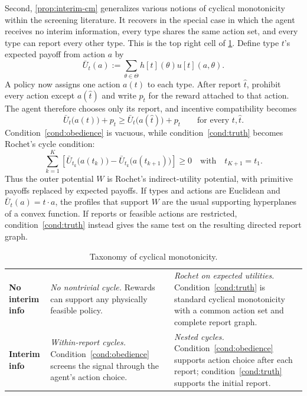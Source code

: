\documentclass[12pt,reqno]{article}
\theoremstyle{definition} \newtheorem{example}{Example}
\theoremstyle{definition} \newtheorem{condition}{Condition}
\theoremstyle{definition} \newtheorem{corollary}{Corollary}
\theoremstyle{definition} \newtheorem{claim}{Claim}
\theoremstyle{definition} \newtheorem{definition}{Definition}
\theoremstyle{definition} \newtheorem{conjecture}{Conjecture}
\theoremstyle{definition} \newtheorem{Lemma}{Lemma}
\theoremstyle{definition} \newtheorem{lemma}{Lemma}
\theoremstyle{plain} \newtheorem{theorem}{Theorem}
\theoremstyle{definition} \newtheorem{assumption}{Assumption}
\theoremstyle{definition} \newtheorem*{assumptionnonumber}{Assumption}
\theoremstyle{definition} \newtheorem*{theoremNoNumber}{Proposition}
\theoremstyle{definition}\newtheorem{proposition}{Proposition}
\theoremstyle{definition} \newtheorem{observation}{Observation}
\theoremstyle{definition} \newtheorem*{definitionNoNumber}{Definition}
\theoremstyle{definition} \newtheorem{Definition}{Definition}
\theoremstyle{definition} \newtheorem*{DefinitionNoNumber}{Definition}
\theoremstyle{definition} \newtheorem*{fact}{Fact}
\theoremstyle{definition} \newtheorem*{property}{Property}
\theoremstyle{definition} \newtheorem{remark}{Remark}
\theoremstyle{definition}\newtheorem{romanexampleinner}{Example}
\begin{document}
Second, \cref{prop:interim-cm} generalizes various notions of cyclical monotonicity within the screening literature. It recovers \cite{rochet1987} in the special case in which the agent receives no interim information, every type shares the same action set, and every type can report every other type. This is the top right cell of \cref{tab:cycle-taxonomy}. Define type $t$'s expected payoff from action $a$ by
\[
\bar U_t(a):=\sum_{\theta\in\Theta}h[t](\theta)u[t](a,\theta).
\]
A policy now assigns one action $a(t)$ to each type. After report $\hat t$, prohibit every action except $a(\hat t)$ and write $p_{\hat t}$ for the reward attached to that action. The agent therefore chooses only its report, and incentive compatibility becomes
\[
\bar U_t\big(a(t)\big)+p_t
\geq
\bar U_t\big(a(\hat t)\big)+p_{\hat t}
\qquad\text{for every }t,\hat t.
\]
Condition~\eqref{cond:obedience} is vacuous, while condition~\eqref{cond:truth} becomes Rochet's cycle condition:
\[
\sum_{k=1}^K
\left[
\bar U_{t_k}\big(a(t_k)\big)
-\bar U_{t_k}\big(a(t_{k+1})\big)
\right]
\geq0 \quad \text{with} \quad  t_{K+1}=t_1.
\]
Thus the outer potential $W$ is Rochet's indirect-utility potential, with primitive payoffs replaced by expected payoffs. If types and actions are Euclidean and $\bar U_t(a)=t\cdot a$, the profiles that support $W$ are the usual supporting hyperplanes of a convex function. If reports or feasible actions are restricted, condition~\eqref{cond:truth} instead gives the same test on the resulting directed report graph.

\begin{table}[H]
\centering
\footnotesize
\renewcommand{\arraystretch}{1.3}
\setlength{\tabcolsep}{5pt}
\begin{tabularx}{\textwidth}{>{\raggedright\arraybackslash}p{2.7cm}|>{\raggedright\arraybackslash}X|>{\raggedright\arraybackslash}X}
& \multicolumn{1}{c|}{\textbf{Type observed}}
& \multicolumn{1}{c}{\textbf{Type private}} \\
\hline
\textbf{No interim info}
& \emph{No nontrivial cycle.} Rewards can support any physically feasible policy.
& \emph{Rochet on expected utilities.} Condition~\eqref{cond:truth} is standard cyclical monotonicity with a common action set and complete report graph. \\
\hline
\textbf{Interim info}
& \emph{Within-report cycles.} Condition~\eqref{cond:obedience} screens the signal through the agent's action choice.
& \emph{Nested cycles.} Condition~\eqref{cond:obedience} supports action choice after each report; condition~\eqref{cond:truth} supports the initial report. 
\\
\end{tabularx}
\caption{Taxonomy of cyclical monotonicity.}
\label{tab:cycle-taxonomy}
\end{table}
\end{document}
